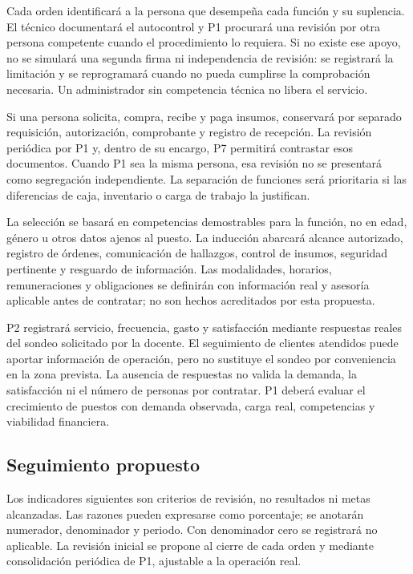 {Cada orden identificará a la persona que desempeña cada función y su suplencia. El técnico documentará el autocontrol y P1 procurará una revisión por otra persona competente cuando el procedimiento lo requiera. Si no existe ese apoyo, no se simulará una segunda firma ni independencia de revisión: se registrará la limitación y se reprogramará cuando no pueda cumplirse la comprobación necesaria. Un administrador sin competencia técnica no libera el servicio.


Si una persona solicita, compra, recibe y paga insumos, conservará por separado requisición, autorización, comprobante y registro de recepción. La revisión periódica por P1 y, dentro de su encargo, P7 permitirá contrastar esos documentos. Cuando P1 sea la misma persona, esa revisión no se presentará como segregación independiente. La separación de funciones será prioritaria si las diferencias de caja, inventario o carga de trabajo la justifican.


La selección se basará en competencias demostrables para la función, no en edad, género u otros datos ajenos al puesto. La inducción abarcará alcance autorizado, registro de órdenes, comunicación de hallazgos, control de insumos, seguridad pertinente y resguardo de información. Las modalidades, horarios, remuneraciones y obligaciones se definirán con información real y asesoría aplicable antes de contratar; no son hechos acreditados por esta propuesta.


P2 registrará servicio, frecuencia, gasto y satisfacción mediante respuestas reales del sondeo solicitado por la docente. El seguimiento de clientes atendidos puede aportar información de operación, pero no sustituye el sondeo por conveniencia en la zona prevista. La ausencia de respuestas no valida la demanda, la satisfacción ni el número de personas por contratar. P1 deberá evaluar el crecimiento de puestos con demanda observada, carga real, competencias y viabilidad financiera.


\subsection{Seguimiento propuesto}
Los indicadores siguientes son criterios de revisión, no resultados ni metas alcanzadas. Las razones pueden expresarse como porcentaje; se anotarán numerador, denominador y periodo. Con denominador cero se registrará no aplicable. La revisión inicial se propone al cierre de cada orden y mediante consolidación periódica de P1, ajustable a la operación real.


}
